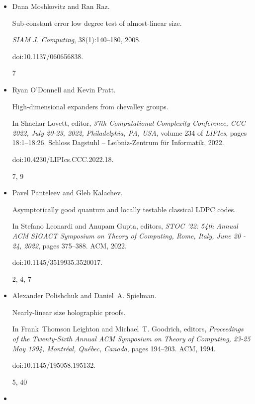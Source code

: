 \documentclass[10pt,a4paper]{article}
\begin{document}
\begin{itemize}
\item[] 
[29]

Dana Moshkovitz and Ran Raz.


Sub-constant error low degree test of almost-linear size.


\emph{SIAM J. Computing}, 38(1):140–180, 2008.


doi:10.1137/060656838.


7




\item[] 
[30]

Ryan O’Donnell and Kevin Pratt.


High-dimensional expanders from chevalley groups.


In Shachar Lovett, editor, \emph{37th Computational Complexity
Conference, CCC 2022, July 20-23, 2022, Philadelphia, PA, USA}, volume
234 of \emph{LIPIcs}, pages 18:1–18:26. Schloss Dagstuhl – Leibniz-Zentrum
für Informatik, 2022.


doi:10.4230/LIPIcs.CCC.2022.18.


7, 9




\item[] 
[31]

Pavel Panteleev and Gleb Kalachev.


Asymptotically good quantum and locally testable classical LDPC
codes.


In Stefano Leonardi and Anupam Gupta, editors, \emph{STOC ’22: 54th
Annual ACM SIGACT Symposium on Theory of Computing, Rome, Italy, June 20
- 24, 2022}, pages 375–388. ACM, 2022.


doi:10.1145/3519935.3520017.


2, 4, 7




\item[] 
[32]

Alexander Polishchuk and Daniel A. Spielman.


Nearly-linear size holographic proofs.


In Frank Thomson Leighton and Michael T. Goodrich, editors, \emph{Proceedings of the Twenty-Sixth Annual ACM Symposium on Theory of
Computing, 23-25 May 1994, Montréal, Québec, Canada}, pages
194–203. ACM, 1994.


doi:10.1145/195058.195132.


5, 40




\item[] 
[33]


\end{itemize}
\end{document}
